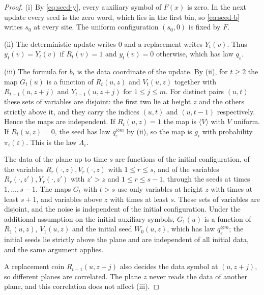 \documentclass[11pt]{article}
\theoremstyle{plain}
\theoremstyle{definition}
\theoremstyle{remark}
\newcommand{\eps}{\varepsilon}
\begin{document}
\begin{proof}
(i) By \eqref{eq:seed-y}, every auxiliary symbol of $F(x)$ is zero. In the next update every seed is the zero word, which lies in the first bin, so \eqref{eq:seed-b} writes $s_0$ at every site. The uniform configuration $(s_0,0)$ is fixed by $F$.

(ii) The deterministic update writes $0$ and a replacement writes $Y_t(v)$. Thus $y_t(v)=Y_t(v)$ if $R_t(v)=1$ and $y_t(v)=0$ otherwise, which has law $q_\eps$.

(iii) The formula for $b_t$ is the data coordinate of the update. By (ii), for $t\geq2$ the map $G_t(u)$ is a function of $R_t(u,z)$ and $V_t(u,z)$ together with $R_{t-1}(u,z+j)$ and $Y_{t-1}(u,z+j)$ for $1\leq j\leq m$. For distinct pairs $(u,t)$ these sets of variables are disjoint: the first two lie at height $z$ and the others strictly above it, and they carry the indices $(u,t)$ and $(u,t-1)$ respectively. Hence the maps are independent. If $R_t(u,z)=1$ the map is $\langle V\rangle$ with $V$ uniform. If $R_t(u,z)=0$, the seed has law $q_\eps^{\otimes m}$ by (ii), so the map is $g_i$ with probability $\pi_i(\eps)$. This is the law $\Lambda_\eps$.

The data of the plane up to time $s$ are functions of the initial configuration, of the variables $R_r(\cdot,z),V_r(\cdot,z)$ with $1\leq r\leq s$, and of the variables $R_r(\cdot,z'),Y_r(\cdot,z')$ with $z'>z$ and $1\leq r\leq s-1$, through the seeds at times $1,\ldots,s-1$. The maps $G_t$ with $t>s$ use only variables at height $z$ with times at least $s+1$, and variables above $z$ with times at least $s$. These sets of variables are disjoint, and the noise is independent of the initial configuration. Under the additional assumption on the initial auxiliary symbols, $G_1(u)$ is a function of $R_1(u,z)$, $V_1(u,z)$ and the initial seed $W_0(u,z)$, which has law $q_\eps^{\otimes m}$; the initial seeds lie strictly above the plane and are independent of all initial data, and the same argument applies.

A replacement coin $R_{t-1}(u,z+j)$ also decides the data symbol at $(u,z+j)$, so different planes are correlated. The plane $z$ never reads the data of another plane, and this correlation does not affect (iii).


\end{proof}
\end{document}
